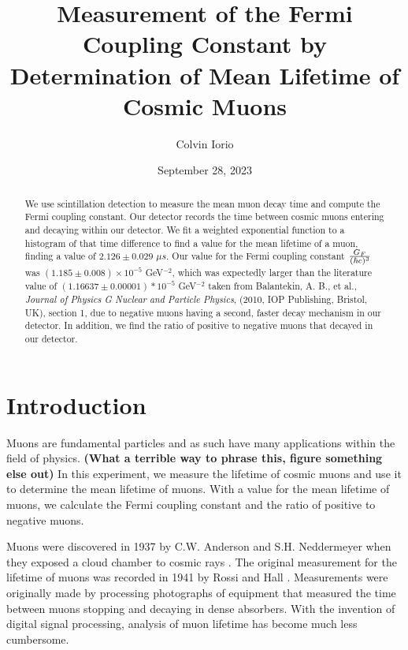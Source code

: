 \documentclass[11pt,letterpaper]{article}
\begin{document}
\title{Measurement of the Fermi Coupling Constant by Determination of Mean Lifetime of Cosmic Muons}

\author{Colvin Iorio}

\date{September 28, 2023}
\maketitle


\begin{abstract}
    We use scintillation detection to measure the mean muon decay time and compute the Fermi coupling constant. Our detector records the time between cosmic muons entering and decaying within our detector. We fit a weighted exponential function to a histogram of that time difference to find a value for the mean lifetime of a muon, finding a value of $2.126 \pm 0.029$ $\mu s$. Our value for the Fermi coupling constant ${G_F \over (\hbar c)^3}$ was $(1.185 \pm 0.008) \times 10^{-5}$ GeV$^{-2}$, which was expectedly larger than the literature value of $(1.16637 \pm 0.00001)*10^{-5}$ GeV$^{-2}$ taken from Balantekin, A. B., et al., \textit{Journal of Physics G Nuclear and Particle Physics}, (2010, IOP Publishing, Bristol, UK), section 1, due to negative muons having a second, faster decay mechanism in our detector. In addition, we find the ratio of positive to negative muons that decayed in our detector.
\end{abstract}


\section{Introduction}\label{sec intro}

Muons are fundamental particles and as such have many applications within the field of physics. \textbf{(What a terrible way to phrase this, figure something else out)} In this experiment, we measure the lifetime of cosmic muons and use it to determine the mean lifetime of muons. With a value for the mean lifetime of muons, we calculate the Fermi coupling constant and the ratio of positive to negative muons.

Muons were discovered in 1937 by C.W. Anderson and S.H. Neddermeyer when they exposed a cloud chamber to cosmic rays \cite{Coan}. The original measurement for the lifetime of muons was recorded in 1941 by Rossi and Hall \cite{Wolfs}. Measurements were originally made by processing photographs of equipment that measured the time between muons stopping and decaying in dense absorbers. With the invention of digital signal processing, analysis of muon lifetime has become much less cumbersome.
\end{document}
